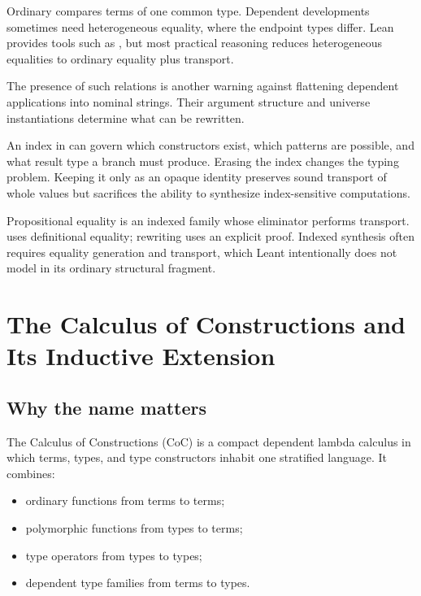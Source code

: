 \documentclass[10pt,letterpaper,oneside,openany]{report}
\newcommand{\term}[1]{\texttt{\detokenize{#1}}}
\begin{document}
Ordinary \term{Eq} compares terms of one common type.  Dependent developments sometimes need heterogeneous equality, where the endpoint types differ.  Lean provides tools such as \term{HEq}, but most practical reasoning reduces heterogeneous equalities to ordinary equality plus transport.

The presence of such relations is another warning against flattening dependent applications into nominal strings.  Their argument structure and universe instantiations determine what can be rewritten.

\begin{keyidea}
An index in \term{Vector α n} can govern which constructors exist, which patterns are possible, and what result type a branch must produce.  Erasing the index changes the typing problem.  Keeping it only as an opaque identity preserves sound transport of whole values but sacrifices the ability to synthesize index-sensitive computations.
\end{keyidea}

\begin{recapbox}
Propositional equality is an indexed family whose eliminator performs transport.  \term{rfl} uses definitional equality; rewriting uses an explicit proof.  Indexed synthesis often requires equality generation and transport, which Leant intentionally does not model in its ordinary structural fragment.
\end{recapbox}

\chapter{The Calculus of Constructions and Its Inductive Extension}\label{ch:coc}

\section{Why the name matters}

The Calculus of Constructions (CoC) is a compact dependent lambda calculus in which terms, types, and type constructors inhabit one stratified language.  It combines:

\begin{itemize}
\item ordinary functions from terms to terms;
\item polymorphic functions from types to terms;
\item type operators from types to types;
\item dependent type families from terms to types.
\end{itemize}
\end{document}
